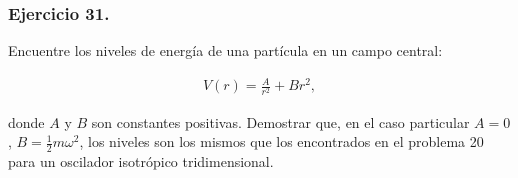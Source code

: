 \documentclass[
course = {{Mecánica Cuántica II}}
]{aga-homework}
\newcommand{\up}[1]{^{#1}}
\begin{document}
\subsubsection*{Ejercicio 31.}
Encuentre los niveles de energía de una partícula en un campo central:

\begin{gather}
V(r) = \frac{A}{r\up{2}}+B r\up{2},
\end{gather}

donde $A$ y $B$ son constantes positivas.
Demostrar que, en el caso particular $A=0$, $B=\frac{1}{2}m\omega\up{2}$, los niveles son los mismos que los encontrados en el problema 20 para un oscilador isotrópico tridimensional.
\end{document}
